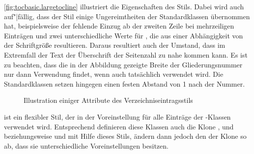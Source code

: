 \begin{description}
  \autoref{fig:tocbasic.largetocline} illustriert die
  Eigenschaften
  des Stils. Dabei wird auch auf"|fällig, dass der Stil einige Ungereimtheiten
  der Standardklassen übernommen hat, beispielsweise der fehlende Einzug ab
  der zweiten Zeile bei mehrzeiligen Einträgen und zwei unterschiedliche Werte
  für , die aus einer Abhängigkeit von der Schriftgröße
  resultieren. Daraus resultiert auch der Umstand, dass im Extremfall der Text
  der Überschrift der Seitenzahl zu nahe kommen kann.  Es ist zu beachten, dass
  die in der Abbildung gezeigte Breite der Gliederungsnummer nur dann
  Verwendung findet, wenn auch tatsächlich 
  verwendet wird. Die Standardklassen setzen hingegen einen festen Abstand von
  1 nach der Nummer.
  \begin{figure}
    \centering
    \caption{Illustration einiger Attribute des Verzeichniseintragsstils
      }
    \label{fig:tocbasic.largetocline}
  \end{figure}
\item[\PValue{tocline}] ist ein flexibler Stil, der in der Voreinstellung für
  alle Einträge der \KOMAScript-Klassen verwendet wird. Entsprechend
  definieren diese Klassen auch die Klone ,  und
   beziehungsweise  und 
  mit Hilfe dieses Stils, ändern dann jedoch den 
  der Klone so ab, dass sie unterschiedliche Voreinstellungen besitzen.


\end{description}
